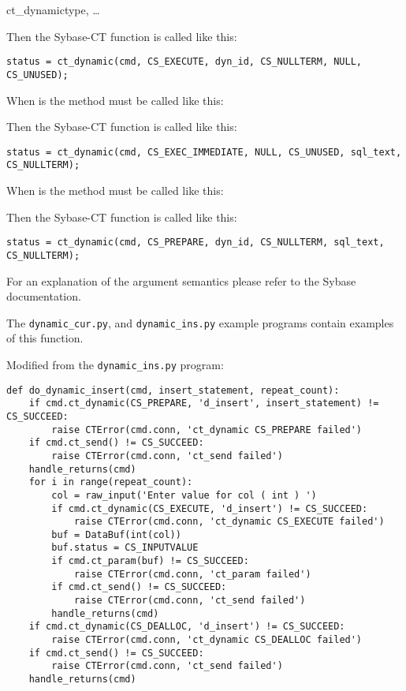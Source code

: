 \begin{methoddesc}[CS_COMMAND]{ct_dynamic}{type, \ldots}

Then the Sybase-CT  function is called like
this:

\begin{verbatim}
status = ct_dynamic(cmd, CS_EXECUTE, dyn_id, CS_NULLTERM, NULL, CS_UNUSED);
\end{verbatim}

When  is  the method must be called
like this:


Then the Sybase-CT  function is called like
this:

\begin{verbatim}
status = ct_dynamic(cmd, CS_EXEC_IMMEDIATE, NULL, CS_UNUSED, sql_text, CS_NULLTERM);
\end{verbatim}

When  is  the method must be called like
this:


Then the Sybase-CT  function is called like
this:

\begin{verbatim}
status = ct_dynamic(cmd, CS_PREPARE, dyn_id, CS_NULLTERM, sql_text, CS_NULLTERM);
\end{verbatim}

For an explanation of the argument semantics please refer to the
Sybase documentation.

The \texttt{dynamic_cur.py}, and \texttt{dynamic_ins.py} example
programs contain examples of this function.

Modified from the \texttt{dynamic_ins.py} program:
\begin{verbatim}
def do_dynamic_insert(cmd, insert_statement, repeat_count):
    if cmd.ct_dynamic(CS_PREPARE, 'd_insert', insert_statement) != CS_SUCCEED:
        raise CTError(cmd.conn, 'ct_dynamic CS_PREPARE failed')
    if cmd.ct_send() != CS_SUCCEED:
        raise CTError(cmd.conn, 'ct_send failed')
    handle_returns(cmd)
    for i in range(repeat_count):
        col = raw_input('Enter value for col ( int ) ')
        if cmd.ct_dynamic(CS_EXECUTE, 'd_insert') != CS_SUCCEED:
            raise CTError(cmd.conn, 'ct_dynamic CS_EXECUTE failed')
        buf = DataBuf(int(col))
        buf.status = CS_INPUTVALUE
        if cmd.ct_param(buf) != CS_SUCCEED:
            raise CTError(cmd.conn, 'ct_param failed')
        if cmd.ct_send() != CS_SUCCEED:
            raise CTError(cmd.conn, 'ct_send failed')
        handle_returns(cmd)
    if cmd.ct_dynamic(CS_DEALLOC, 'd_insert') != CS_SUCCEED:
        raise CTError(cmd.conn, 'ct_dynamic CS_DEALLOC failed')
    if cmd.ct_send() != CS_SUCCEED:
        raise CTError(cmd.conn, 'ct_send failed')
    handle_returns(cmd)
\end{verbatim}
\end{methoddesc}

